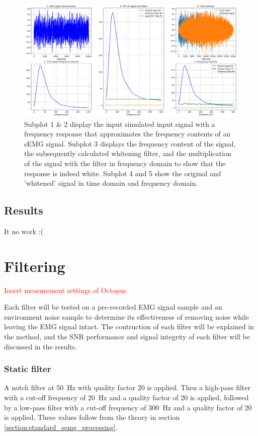 \begin{figure}[h!t]
	\begin{center}
		\includegraphics[width=1.0\columnwidth]{images/prewhitening_simulation.png}
	\end{center}
	\caption{Subplot 1 & 2 display the input simulated input signal with a frequency response that approximates the frequency contents of an sEMG signal. Subplot 3 displays the frequency content of the signal, the subsequently calculated whitening filter, and the multiplication of the signal with the filter in frequency domain to show that the response is indeed white. Subplot 4 and 5 show the original and 'whitened' signal in time domain and frequency domain.}
	\label{fig:whitening_simulation}
\end{figure}


\subsection{Results}
It no work :(


\section{Filtering}

\textcolor{red}{Insert measurement settings of Octopus}

Each filter will be tested on a pre-recorded EMG signal sample and an environment noise sample to determine its effectiveness of removing noise while leaving the EMG signal intact. The contruction of each filter will be explained in the method, and the SNR performance and signal integrity of each filter will be discussed in the results. 

\subsubsection{Static filter}
A notch filter at \SI{50}{\hertz} with quality factor 20 is applied. Then a high-pass filter with a cut-off frequency of \SI{20}{\hertz} and a quality factor of 20 is applied, followed by a low-pass filter with a cut-off frequency of \SI{300}{\hertz} and a quality factor of 20 is applied. These values follow from the theory in section \ref{section:standard_semg_processing}.

